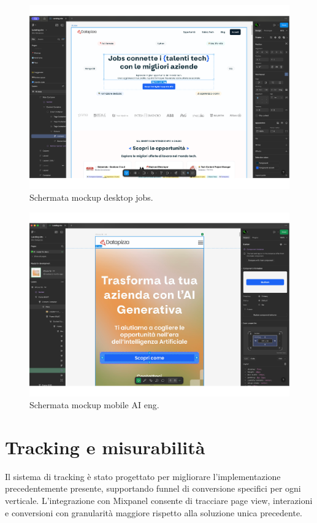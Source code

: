 \begin{figure}[h!]
    \centering
    \includegraphics[width=1.1\textwidth]{chapters/figures/mockup.pdf}
    \caption{Schermata mockup desktop jobs.}
    \label{fig:refactoring}
\end{figure}

\begin{figure}[h!]
    \centering
    \includegraphics[width=1.1\textwidth]{chapters/figures/mockup2.pdf}
    \caption{Schermata mockup mobile AI eng.}
    \label{fig:refactoring}
\end{figure}

\section{Tracking e misurabilità}
Il sistema di tracking è stato progettato per migliorare l'implementazione 
precedentemente presente, supportando funnel di conversione specifici per ogni 
verticale. L'integrazione con Mixpanel consente di tracciare page view, 
interazioni e conversioni con granularità maggiore rispetto alla soluzione unica 
precedente.

